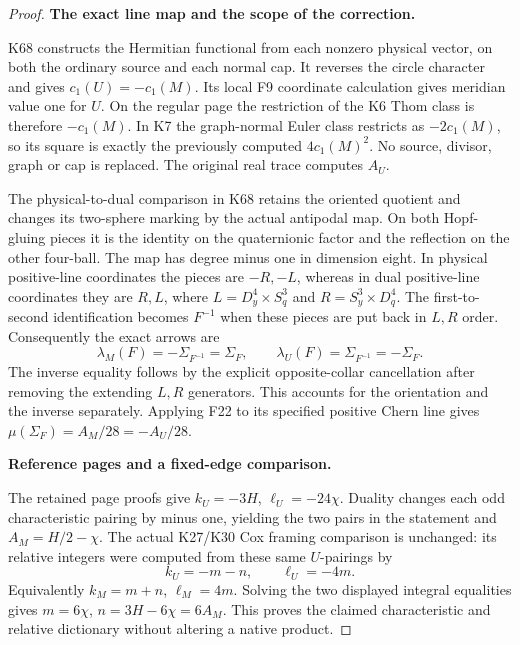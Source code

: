 \begin{proof}
\par\medskip\noindent\textbf{The exact line map and the scope of the correction.}\par\nobreak
K68 constructs the Hermitian functional from each nonzero physical
vector, on both the ordinary source and each normal cap. It reverses
the circle character and gives \(c_1(U)=-c_1(M)\). Its local F9
coordinate calculation gives meridian value one for \(U\).
On the regular page the restriction of the K6 Thom class is therefore
\(-c_1(M)\). In K7 the graph-normal Euler class restricts as
\(-2c_1(M)\), so its square is exactly the previously computed
\(4c_1(M)^2\). No source, divisor, graph or cap is replaced.
The original real trace computes \(A_U\).

The physical-to-dual comparison in K68 retains the oriented quotient
and changes its two-sphere marking by the actual antipodal map. On
both Hopf-gluing pieces it is the identity on the quaternionic factor
and the reflection on the other four-ball. The map has degree minus
one in dimension eight. In physical positive-line coordinates the
pieces are \(-R,-L\), whereas in dual positive-line coordinates they
are \(R,L\), where
\(L=D^4_y\times S^3_q\) and \(R=S^3_y\times D^4_q\).
The first-to-second identification becomes \(F^{-1}\) when these
pieces are put back in \(L,R\) order. Consequently the exact arrows
are
\[
 \lambda_M(F)=-\Sigma_{F^{-1}}=\Sigma_F,\qquad
 \lambda_U(F)=\Sigma_{F^{-1}}=-\Sigma_F.
\]
The inverse equality follows by the explicit opposite-collar
cancellation after removing the extending \(L,R\) generators.
This accounts for the orientation and the inverse separately.
Applying F22 to its specified positive Chern line gives
\(\mu(\Sigma_F)=A_M/28=-A_U/28\).

\par\medskip\noindent\textbf{Reference pages and a fixed-edge comparison.}\par\nobreak
The retained page proofs give
\(k_U=-3H\), \(\ell_U=-24\chi\). Duality changes each odd
characteristic pairing by minus one, yielding the two pairs in the
statement and \(A_M=H/2-\chi\). The actual K27/K30 Cox framing
comparison is unchanged: its relative integers were computed from
these same \(U\)-pairings by
\[
 k_U=-m-n,\qquad \ell_U=-4m.
\]
Equivalently \(k_M=m+n\), \(\ell_M=4m\). Solving the two displayed
integral equalities gives \(m=6\chi\), \(n=3H-6\chi=6A_M\).
This proves the claimed characteristic and relative dictionary without
altering a native product.


\end{proof}
